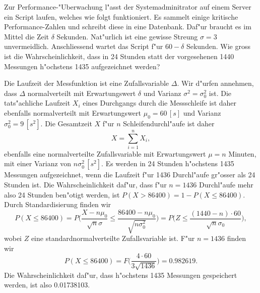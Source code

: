 Zur Performance-"Uberwachung l"asst der Systemadminitrator auf einem Server
ein Script laufen, welches wie folgt funktioniert. Es sammelt einige
kritische Performance-Zahlen und schreibt diese in eine Datenbank.
Daf"ur braucht es im Mittel die Zeit $\delta$ Sekunden. Nat"urlich
ist eine gewisse Streung $\sigma=3$ unvermeidlich.
Anschliessend wartet das Script f"ur $60-\delta$ Sekunden.
Wie gross ist die Wahrscheinlichkeit, dass in 24 Stunden statt
der vorgesehenen 1440 Messungen h"ochstens 1435 aufgezeichnet werden?

\begin{loesung}
Die Laufzeit der Messfunktion ist eine Zufallsvariable $\Delta$.
Wir d"urfen annehmen, dass $\Delta$ normalverteilt mit Erwartungswert
$\delta$ und Varianz $\sigma^2=\sigma_0^2$ ist. Die tats"achliche Laufzeit $X_i$ eines
Durchgangs durch die Messschleife ist daher ebenfalls normalverteilt
mit Erwartungswert $\mu_0=60\,[s]$ und Varianz $\sigma_0^2=9\,[s^2]$.
Die Gesamtzeit $X$ f"ur
$n$ Schleifendurchl"aufe ist daher
\[
X=\sum_{i=1}^nX_i,
\]
ebenfalls eine normalverteilte Zufallsvariable
mit Erwartungswert $\mu = n$ Minuten,
mit einer Varianz von $n\sigma_0^2\,[s^2]$.
Es werden in 24 Stunden h"ochstens 1435 Messungen aufgezeichnet,
wenn die Laufzeit f"ur
1436 Durchl"aufe gr"osser als 24 Stunden ist. Die Wahrscheinlichkeit daf"ur,
dass f"ur $n=1436$ Durchl"aufe mehr also 24 Stunden ben"otigt werden, 
ist $P(X > 86400) = 1-P(X\le 86400)$.
Durch Standardisierung finden wir
\[
P(X\le 86400)=P\biggl(
\frac{X-n\mu_0}{\sqrt{n}\sigma}\le \frac{86400-n\mu_0}{\sqrt{n\sigma_0^2}}
\biggr)
=P\biggl(
Z\le\frac{(1440-n)\cdot 60}{\sqrt{n}\sigma_0}
\biggr),
\]
wobei $Z$ eine standardnormalverteilte Zufallsvariable ist. F"ur $n=1436$
finden wir
\[
P(X\le 86400)=F\biggl(
\frac{4\cdot 60}{3\sqrt{1436}}
\biggr)=0.982619.
\]
Die Wahrscheinlichkeit daf"ur, dass h"ochstens 1435 Messungen gespeichert
werden, ist also 0.01738103.
\end{loesung}
